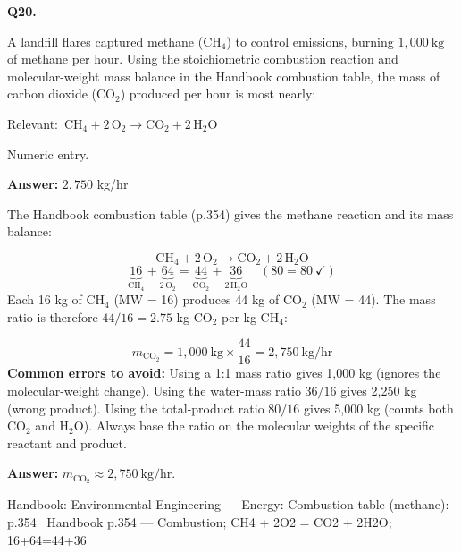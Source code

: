 \documentclass[11pt]{article}
\begin{document}
\vspace{9pt}
\filbreak
\textbf{\color{accent}Q20.}\par\vspace{2pt}
A landfill flares captured methane ($\text{CH}_4$) to control emissions, burning $1{,}000\ \text{kg}$ of methane per hour. Using the stoichiometric combustion reaction and molecular-weight mass balance in the Handbook combustion table, the mass of carbon dioxide ($\text{CO}_2$) produced per hour is most nearly:\par\par\vspace{3pt}
{\small\color{soft}Relevant:}\ $\text{CH}_4 + 2\,\text{O}_2 \rightarrow \text{CO}_2 + 2\,\text{H}_2\text{O}$\par\vspace{3pt}
{\small\color{soft}Numeric entry.}\par\vspace{3pt}
\vspace{2pt}\par\noindent\colorbox{boxbg}{\parbox{\dimexpr\linewidth-2\fboxsep\relax}{%
\vspace{2pt}\textbf{Answer:} $2{,}750$ kg/hr\par\vspace{2pt}
{\small The Handbook combustion table (p.354) gives the methane reaction and its mass balance:\par
\[\text{CH}_4 + 2\,\text{O}_2 \rightarrow \text{CO}_2 + 2\,\text{H}_2\text{O}\]
\[\underbrace{16}_{\text{CH}_4} + \underbrace{64}_{2\,\text{O}_2} = \underbrace{44}_{\text{CO}_2} + \underbrace{36}_{2\,\text{H}_2\text{O}} \quad (80 = 80\ \checkmark)\]
Each 16 kg of $\text{CH}_4$ (MW = 16) produces 44 kg of $\text{CO}_2$ (MW = 44). The mass ratio is therefore $44/16 = 2.75$ kg $\text{CO}_2$ per kg $\text{CH}_4$:\par
\[m_{\text{CO}_2} = 1{,}000\ \text{kg} \times \frac{44}{16} = 2{,}750\ \text{kg/hr}\]
\textbf{Common errors to avoid:} Using a 1:1 mass ratio gives 1,000 kg (ignores the molecular-weight change). Using the water-mass ratio $36/16$ gives 2,250 kg (wrong product). Using the total-product ratio $80/16$ gives 5,000 kg (counts both $\text{CO}_2$ and $\text{H}_2\text{O}$). Always base the ratio on the molecular weights of the specific reactant and product.\par
\textbf{Answer:} $m_{\text{CO}_2} \approx 2{,}750\ \text{kg/hr}$.\par}\par\vspace{2pt}
{\footnotesize\color{soft}Handbook: Environmental Engineering --- Energy: Combustion table (methane): p.354 \textbullet\ Handbook p.354 --- Combustion; CH4 + 2O2 = CO2 + 2H2O; 16+64=44+36}\vspace{2pt}
}}
\end{document}
